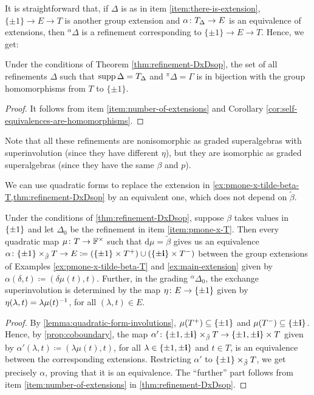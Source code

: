 It is straightforward that, if $\Delta$ is as in item \eqref{item:there-is-extension},  $\{ \pm 1 \} \rightarrow E \rightarrow T$ is another group extension and $\alpha\colon T_\Delta \to E$ is an equivalence of extensions, then ${}^\alpha \Delta$ is a refinement corresponding to $\{ \pm 1 \} \rightarrow E \rightarrow T$. 
Hence, we get:

\begin{cor}\label{cor:old-item-iv}
	Under the conditions of Theorem \ref{thm:refinement-DxDsop}, the set of all refinements $\Delta$ such that $\operatorname{supp} \Delta = T_\Delta$ and ${}^\pi \Delta = \Gamma$ is in bijection with the group homomorphisms from $T$ to $\{ \pm 1 \}$.
\end{cor}

\begin{proof}
	It follows from item \eqref{item:number-of-extensions} and Corollary \ref{cor:self-equivalences-are-homomorphisms}.
\end{proof}

Note that all these refinements are nonisomorphic as graded superalgebras with superinvolution (since they have different $\eta$), but they are isomorphic as graded superalgebras (since they have the same $\beta$ and $p$). 

We can use quadratic forms to replace the extension in \cref{ex:pmone-x-tilde-beta-T,thm:refinement-DxDsop} by an equivalent one, which does not depend on $\tilde\beta$. 

\begin{lemma}\label{lemma:tildeT-finally}
	Under the conditions of \cref{thm:refinement-DxDsop}, suppose $\beta$ takes values in $\{ \pm 1 \}$ and let $\Delta_0$ be the refinement in item \eqref{item:pmone-x-T}. 
    Then every quadratic map $\mu\colon T \to \mathbb{F}^\times$ such that $\mathrm{d}\mu = \tilde\beta$ gives us an equivalence $\alpha\colon \{ \pm 1 \} \times_{\tilde\beta} T \to E \coloneqq (\{ \pm 1 \} \times T^+) \cup (\{ \pm \mathbf{i}\} \times T^-)$ between the group extensions of Examples \ref{ex:pmone-x-tilde-beta-T} and  \ref{ex:main-extension} given by $\alpha(\delta, t) \coloneqq (\delta \mu(t), t)$. 
    Further, in the grading ${}^\alpha \Delta_0$, the exchange superinvolution is determined by the map $\eta\colon E \to \{ \pm 1 \}$ given by $\eta(\lambda, t) = \lambda\mu(t)^{-1}$, for all $(\lambda, t) \in E$. 
\end{lemma}

\begin{proof}
    By \cref{lemma:quadratic-form-involutions}, $\mu(T^+) \subseteq \{ \pm 1 \}$ and $\mu(T^-) \subseteq \{ \pm \mathbf{i} \}$. 
    Hence, by \cref{prop:coboundary}, the map $\alpha'\colon \{ \pm 1, \pm \mathbf{i} \} \times_{\tilde\beta} T \to \{ \pm 1, \pm \mathbf{i} \} \times T$ given by $\alpha'(\lambda, t) \coloneqq (\lambda\mu(t), t)$, for all $\lambda \in \{ \pm 1, \pm \mathbf{i} \}$ and $t\in T$, is an equivalence between the corresponding extensions. 
    Restricting $\alpha'$ to $\{ \pm 1 \} \times_{\tilde\beta} T$, we get precisely $\alpha$, proving that it is an equivalence. 
    The ``further'' part follows from item \eqref{item:number-of-extensions} in \cref{thm:refinement-DxDsop}. 
\end{proof}


